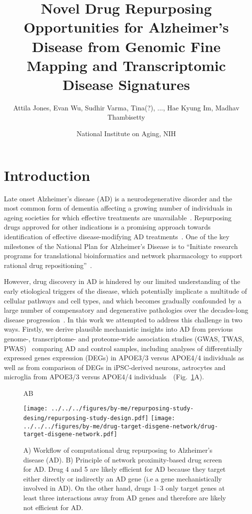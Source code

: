 \documentclass[letterpaper]{article}
\title{Novel Drug Repurposing Opportunities for Alzheimer's Disease from
  Genomic Fine Mapping and Transcriptomic Disease Signatures}
\author{Attila Jones, Evan Wu, Sudhir Varma, Tina(?), ..., Hae Kyung Im, Madhav Thambisetty}
\date{National Institute on Aging, NIH}
\begin{document}
\maketitle
\section{Introduction}

Late onset Alzheimer's disease (AD) is a neurodegenerative disorder and the most
common form of dementia affecting a growing number of individuals in ageing
societies for which effective treatments are
unavailable~\citep{Bondi2017,Masters2015}.  Repurposing drugs approved for other indications is
a promising approach  towards identification of effective disease-modifying AD
treatments~\citep{Pushpakom2019,Fang2021,Taubes2021}.  One of the key
milestones of the National Plan for Alzheimer’s Disease is to ``Initiate
research programs for translational bioinformatics and network pharmacology to
support rational drug repositioning''~\citep{Aging}.

However, drug discovery in AD is hindered by our limited understanding of the
early etiological triggers of the disease, which potentially implicate a
multitude of cellular pathways and cell types, and which becomes gradually
confounded by a large number of compensatory and degenerative pathologies over
the decades-long disease progression~\citep{DeStrooper2016}.  In this work we
attempted to address this challenge in two ways.  Firstly, we derive plausible
mechanistic insights into AD from previous genome-, transcriptome- and
proteome-wide association studies (GWAS, TWAS,
PWAS)~\citep{Jansen2019,Kunkle2019,Gerring2020,Baird2021,Schwartzentruber2021,Wightman2021,Wingo2021}
comparing AD and control samples, including analyses of differentially
expressed genes expression (DEGs) in APOE3/3 versus APOE4/4 individuals as
well as from comparison of DEGs in iPSC-derived neurons, astrocytes and
microglia from APOE3/3 versus APOE4/4
individuals~\citep{Taubes2021,Lin2018}~(Fig.~\ref{fig:workflow}A).

\begin{figure}
\hspace{0.05\textwidth}A\hspace{0.7\textwidth}B

\texttt{[image: ../../../figures/by-me/repurposing-study-desing/repurposing-study-design.pdf]}
\texttt{[image: ../../../figures/by-me/drug-target-disgene-network/drug-target-disgene-network.pdf]}
\caption{
  A) Workflow of computational drug repurposing to Alzheimer's disease (AD).
  B) Principle of network proximity-based drug screen for AD.  Drug 4 and 5
  are likely efficient for AD because they target either directly or
  indirectly an AD gene (i.e a gene mechanistically involved in AD).  On the other
  hand, drugs 1--3 only target genes at least three interactions away from AD
  genes and therefore are likely not efficient for AD.
}
\label{fig:workflow}
\end{figure}
\end{document}

